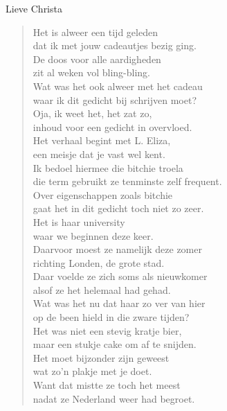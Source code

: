 \documentclass[12pt]{brief}
\date{3 september 2006}
\begin{document}
\begin{letter}{Lieve Christa}

\opening{}


\begin{verse}

Het is alweer een tijd geleden\\
dat ik met jouw cadeautjes bezig ging.\\
De doos voor alle aardigheden\\
zit al weken vol bling-bling.\\[1.5em]

Wat was het ook alweer met het cadeau\\
waar ik dit gedicht bij schrijven moet?\\
Oja, ik weet het, het zat zo,\\
inhoud voor een gedicht in overvloed.\\[1.5em]

Het verhaal begint met L. Eliza,\\
een meisje dat je vast wel kent.\\
Ik bedoel hiermee die bitchie troela\\
die term gebruikt ze tenminste zelf frequent.\\[1.5em]

Over eigenschappen zoals bitchie\\
gaat het in dit gedicht toch niet zo zeer.\\
Het is haar university\\
waar we beginnen deze keer.\\[1.5em]

Daarvoor moest ze namelijk deze zomer\\
richting Londen, de grote stad.\\
Daar voelde ze zich soms als nieuwkomer\\
alsof ze het helemaal had gehad.\\[3.5em]

Wat was het nu dat haar zo ver van hier\\
op de been hield in die zware tijden?\\
Het was niet een stevig kratje bier,\\
maar een stukje cake om af te snijden.\\[1.5em]

Het moet bijzonder zijn geweest\\
wat zo'n plakje met je doet.\\
Want dat mistte ze toch het meest\\
nadat ze Nederland weer had begroet.\\[1.5em]


\end{verse}
\end{letter}
\end{document}
